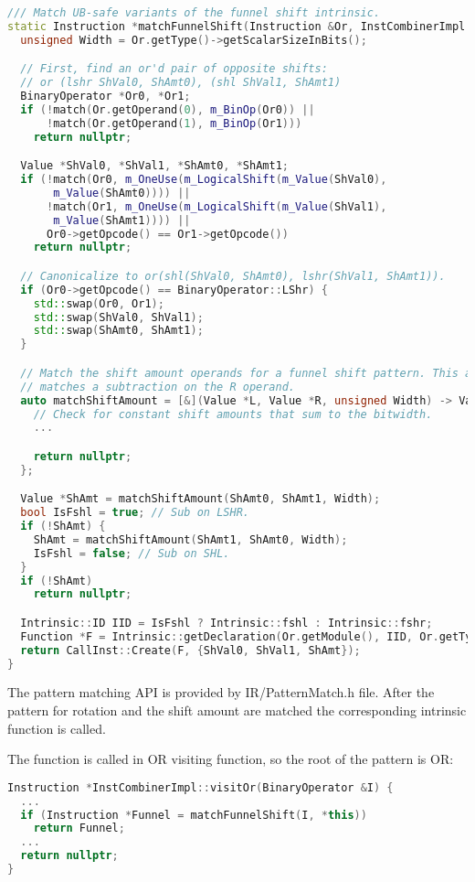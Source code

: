 \begin{lstlisting}[language=C++, caption={Funnel Shift Right Pattern Matching}]
/// Match UB-safe variants of the funnel shift intrinsic.
static Instruction *matchFunnelShift(Instruction &Or, InstCombinerImpl &IC){
  unsigned Width = Or.getType()->getScalarSizeInBits();

  // First, find an or'd pair of opposite shifts:
  // or (lshr ShVal0, ShAmt0), (shl ShVal1, ShAmt1)
  BinaryOperator *Or0, *Or1;
  if (!match(Or.getOperand(0), m_BinOp(Or0)) ||
      !match(Or.getOperand(1), m_BinOp(Or1)))
    return nullptr;

  Value *ShVal0, *ShVal1, *ShAmt0, *ShAmt1;
  if (!match(Or0, m_OneUse(m_LogicalShift(m_Value(ShVal0),
       m_Value(ShAmt0)))) ||
      !match(Or1, m_OneUse(m_LogicalShift(m_Value(ShVal1), 
       m_Value(ShAmt1)))) ||
      Or0->getOpcode() == Or1->getOpcode())
    return nullptr;

  // Canonicalize to or(shl(ShVal0, ShAmt0), lshr(ShVal1, ShAmt1)).
  if (Or0->getOpcode() == BinaryOperator::LShr) {
    std::swap(Or0, Or1);
    std::swap(ShVal0, ShVal1);
    std::swap(ShAmt0, ShAmt1);
  }

  // Match the shift amount operands for a funnel shift pattern. This always
  // matches a subtraction on the R operand.
  auto matchShiftAmount = [&](Value *L, Value *R, unsigned Width) -> Value * {
    // Check for constant shift amounts that sum to the bitwidth.
    ...

    return nullptr;
  };

  Value *ShAmt = matchShiftAmount(ShAmt0, ShAmt1, Width);
  bool IsFshl = true; // Sub on LSHR.
  if (!ShAmt) {
    ShAmt = matchShiftAmount(ShAmt1, ShAmt0, Width);
    IsFshl = false; // Sub on SHL.
  }
  if (!ShAmt)
    return nullptr;

  Intrinsic::ID IID = IsFshl ? Intrinsic::fshl : Intrinsic::fshr;
  Function *F = Intrinsic::getDeclaration(Or.getModule(), IID, Or.getType());
  return CallInst::Create(F, {ShVal0, ShVal1, ShAmt});
}
\end{lstlisting}

The pattern matching API is provided by IR/PatternMatch.h file. After the pattern for rotation and the shift amount are matched the corresponding intrinsic function is called. 

The function is called in OR visiting function, so the root of the pattern is OR:

\begin{lstlisting}[language=C++, caption={Funnel Shift Right Pattern Function Called}]
Instruction *InstCombinerImpl::visitOr(BinaryOperator &I) {
  ...
  if (Instruction *Funnel = matchFunnelShift(I, *this))
    return Funnel;
  ...
  return nullptr;
}


\end{lstlisting}


